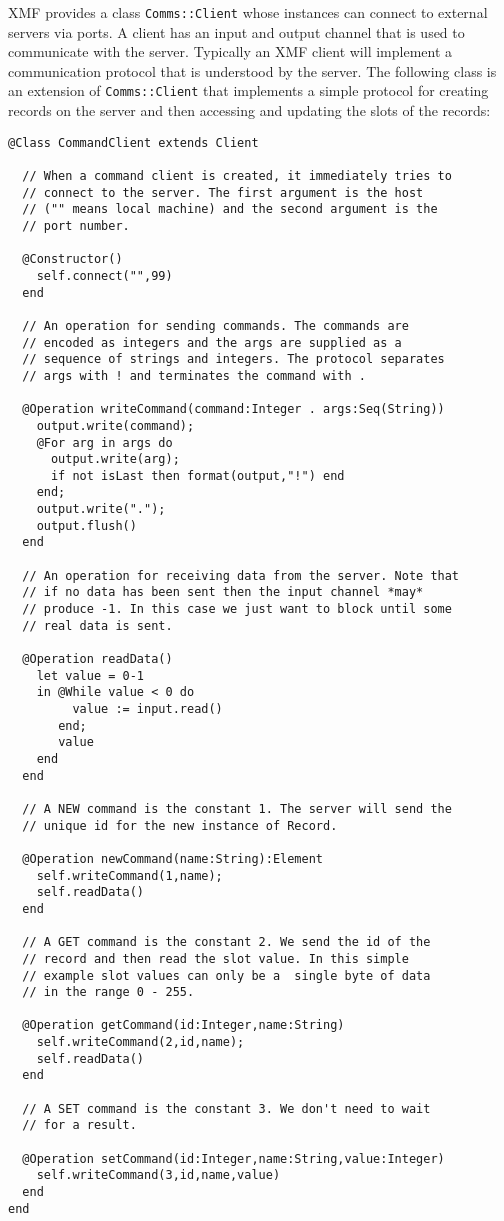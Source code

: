 \documentclass{article}
\begin{document}
XMF provides a class {\tt Comms::Client} whose instances can connect to external servers via
ports. A client has an input and output channel that is used to communicate with the server.
Typically an XMF client will implement a communication protocol that is understood by the 
server. The following class is an extension of {\tt Comms::Client} that implements a 
simple protocol for creating records on the server and then accessing and updating the
slots of the records:
\begin{verbatim}
@Class CommandClient extends Client

  // When a command client is created, it immediately tries to 
  // connect to the server. The first argument is the host 
  // ("" means local machine) and the second argument is the 
  // port number.
  
  @Constructor()
    self.connect("",99)
  end
  
  // An operation for sending commands. The commands are 
  // encoded as integers and the args are supplied as a 
  // sequence of strings and integers. The protocol separates 
  // args with ! and terminates the command with .
  
  @Operation writeCommand(command:Integer . args:Seq(String))
    output.write(command);
    @For arg in args do
      output.write(arg);
      if not isLast then format(output,"!") end
    end;
    output.write(".");
    output.flush()
  end
  
  // An operation for receiving data from the server. Note that 
  // if no data has been sent then the input channel *may* 
  // produce -1. In this case we just want to block until some 
  // real data is sent.
  
  @Operation readData()
    let value = 0-1
    in @While value < 0 do
         value := input.read()
       end;
       value
    end
  end
  
  // A NEW command is the constant 1. The server will send the 
  // unique id for the new instance of Record.
  
  @Operation newCommand(name:String):Element
    self.writeCommand(1,name);
    self.readData()
  end
  
  // A GET command is the constant 2. We send the id of the 
  // record and then read the slot value. In this simple 
  // example slot values can only be a  single byte of data 
  // in the range 0 - 255.
  
  @Operation getCommand(id:Integer,name:String)
    self.writeCommand(2,id,name);
    self.readData()
  end
  
  // A SET command is the constant 3. We don't need to wait 
  // for a result.
  
  @Operation setCommand(id:Integer,name:String,value:Integer)
    self.writeCommand(3,id,name,value)
  end
end
\end{verbatim}
\end{document}
